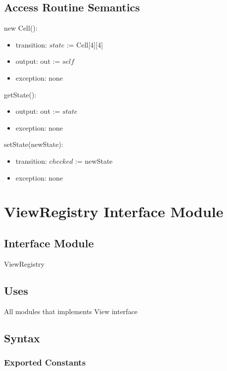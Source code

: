 \documentclass[12pt]{article}
\begin{document}
\subsection* {Access Routine Semantics}
new Cell():
\begin{itemize}
\item transition: $state$ := Cell[4][4]
\item output: out := $self$
\item exception: none
\end{itemize}
getState():
\begin{itemize}
\item output: out := $state$
\item exception: none
\end{itemize}
setState(newState):
\begin{itemize}
\item transition: $checked$ := newState
\item exception: none
\end{itemize}
\newpage









%

\section*{ViewRegistry Interface Module}

\subsection* {Interface Module}

ViewRegistry

\subsection* {Uses}

All modules that implements View interface

\subsection* {Syntax}

\subsubsection* {Exported Constants}
\end{document}
